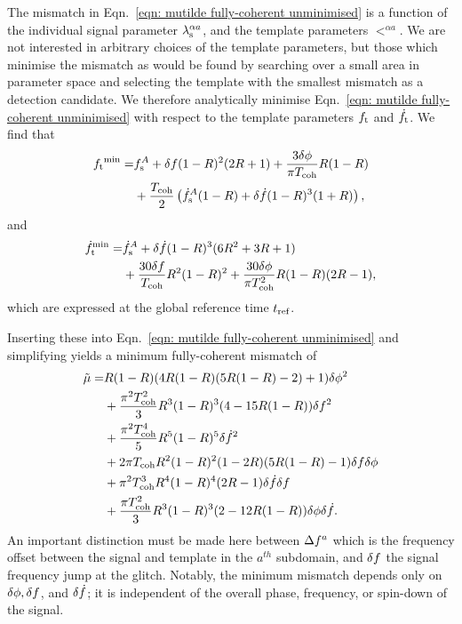 \documentclass[../full_thesis/full_thesis.tex]{subfiles}
\begin{document}
The mismatch in Eqn.~\eqref{eqn: mutilde fully-coherent unminimised} is a
function of the individual signal parameter ${\lambda}_\textrm{s}^{\alpha a}$, and the template
parameters $\lt^{\alpha a}$. We are not interested in arbitrary choices of the template
parameters, but those which minimise the mismatch as would be found by
searching over a small area in parameter space and selecting the template with
the smallest mismatch as a detection candidate. We therefore
analytically minimise Eqn.~\eqref{eqn: mutilde fully-coherent unminimised} with
respect to the template parameters ${f_{\textrm{t}}}$ and $\dot{f}_{\textrm{t}}$.
We find that
\begin{align}
\begin{split}
{f_{\textrm{t}}}^{\textrm{min}} = &
f_{\textrm{s}}^A + \delta f(1-R)^2(2R+1)
      + \frac{3\delta\phi}{\pi T_{\mathrm{coh}}}R(1-R) \\
& + \frac{T_{\mathrm{coh}}}{2}\left(\dot{f}_{\textrm{s}}^A(1-R)+\delta\dot{f}(1-R)^{3}(1+R)\right),
\end{split}
\end{align}
and
\begin{align}
\begin{split}
\dot{f}_{\textrm{t}}^{\textrm{min}} = &
\dot{f}_{\textrm{s}}^{A} + \delta\dot{f}(1-R)^{3}(6R^{2} + 3R + 1) \\
& + \frac{30\delta f}{T_{\mathrm{coh}}} R^{2}(1-R)^{2} +
\frac{30\delta\phi}{\pi T_{\mathrm{coh}}^{2}} R (1-R)(2R-1),
\end{split}
\end{align}
which are expressed at the global reference time $t_{\textrm{ref}}$.

Inserting these into Eqn.~\eqref{eqn: mutilde fully-coherent unminimised} and
simplifying yields a minimum fully-coherent mismatch of
\begin{align}
\begin{split}
\tilde{\mu} = & R(1-R)(4R(1-R)(5R(1-R)-2) + 1)\delta\phi^{2} \\
& + \frac{\pi^{2}T_{\mathrm{coh}}^{2}}{3} R^{3}(1-R)^{3}(4 - 15R(1-R)) \delta f^{2}\\
& + \frac{\pi^{2}T_{\mathrm{coh}}^{4}}{5} R^{5}(1-R)^{5}\delta\dot{f}^{2} \\
& + 2\pi T_{\mathrm{coh}} R^{2}(1-R)^{2}(1-2R)(5R(1-R)-1)\delta f\delta\phi\\
& + \pi^{2} T_{\mathrm{coh}}^{3}R^{4}(1-R)^{4}(2R-1)\delta\dot{f}\delta f \\
& + \frac{\pi T_{\mathrm{coh}}^{2}}{3}R^{3}(1-R)^{3}(2-12R(1-R))\delta\phi\delta\dot{f}.
\end{split}
\label{eqn: mismatch fully-coherent glitch}
\end{align}
An important distinction must be made here between $\Delta f^{a}$ which is the
frequency offset between the signal and template in the $a^{th}$ subdomain, and $\delta f$
the signal frequency jump at the glitch. Notably, the minimum mismatch
depends only on $\delta\phi, \delta f$, and $\delta\dot{f}$; it is
independent of the overall phase, frequency, or spin-down of the signal.
\end{document}
